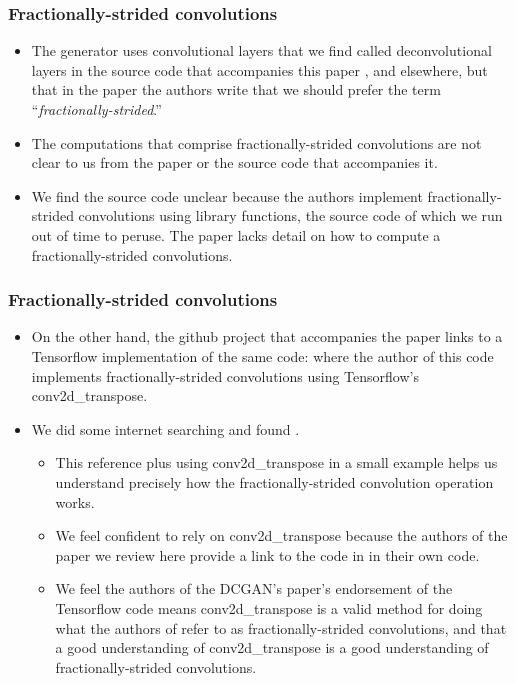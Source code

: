 \documentclass{beamer}
\begin{document}


\begin{frame}
\frametitle{Fractionally-strided convolutions}
\begin{itemize}

\item The generator uses convolutional layers that we find called
deconvolutional layers in the source code that accompanies this paper
\cite{dcganCode}, and elsewhere, but that in the paper the authors write that
we should prefer the term ``\textit{fractionally-strided}.''  

\item The computations that comprise fractionally-strided convolutions are not
clear to us from the paper or the source code that accompanies it.  

\item We find the source code unclear because the authors implement
  fractionally-strided convolutions using library functions, the source code of
  which we run out of time to peruse.  The paper lacks detail on how to compute a
  fractionally-strided convolutions.
\end{itemize}
\end{frame}


\begin{frame}
\frametitle{Fractionally-strided convolutions}
\begin{itemize} 
  \item On the other hand, the github project \cite{dcganCode}
  that accompanies the paper \cite{repLearnDcgan} links to a Tensorflow
  implementation of the same code: \cite{dcganTf} where the author of this code
  implements fractionally-strided convolutions using Tensorflow's
  conv2d\_transpose.  
    
  \item We did some internet searching and found \cite{convArith}.
  \begin{itemize} 
    
  \item This reference plus using conv2d\_transpose in a small
      example helps us understand precisely how the fractionally-strided convolution
      operation works.  
    
      \item We feel confident to rely on conv2d\_transpose because
      the authors of the paper \cite{repLearnDcgan} we review here provide a link to
      the code in \cite{dcganTf} in their own code. 
          
      \item We feel the authors of the DCGAN's paper's endorsement of the
      Tensorflow code means conv2d\_transpose is a valid method for doing what the
      authors of \cite{repLearnDcgan} refer to as fractionally-strided convolutions,
      and that a good understanding of conv2d\_transpose is a good understanding of
      fractionally-strided convolutions.  
   \end{itemize} 
\end{itemize}
\end{frame}
\end{document}
